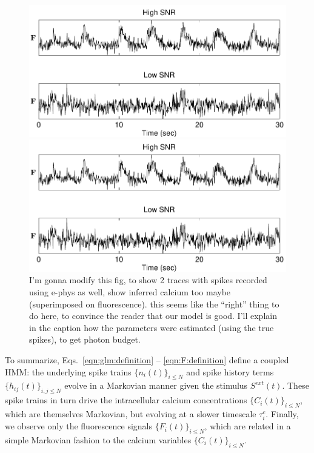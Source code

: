 \begin{figure}
\centering
\begin{minipage}[c]{0.45\hsize}
\includegraphics[width=\hsize]{../figs/example_traces}
\end{minipage}
\centering
\begin{minipage}[c]{0.45\hsize}
\includegraphics[width=\hsize]{../figs/example_traces}
\end{minipage}
\caption{I'm gonna modify this fig, to show 2 traces with spikes recorded using e-phys as well, show inferred calcium too maybe (superimposed on fluorescence).  this seems like the ``right'' thing to do here, to convince the reader that our model is good. I'll explain in the caption how the parameters were estimated (using the true spikes), to get photon budget.}
\label{fig:example_traces}
\end{figure}

To summarize, Eqs.~\eqref{eqn:glm:definition} -- \eqref{eqn:F:definition} define a coupled HMM: the underlying spike trains $\{n_i(t)\}_{i\leq N}$ and spike history terms $\{h_{ij}(t)\}_{i,j\leq N}$ evolve in a Markovian manner given the stimulus $S^{ext}(t)$. These spike trains in turn drive the intracellular calcium concentrations $\{C_i(t)\}_{i\leq N}$, which are themselves Markovian, but evolving at a slower timescale $\tau_i^c$. Finally, we observe only the fluorescence signals $\{F_i(t)\}_{i\leq N}$, which are related in a simple Markovian fashion to the calcium variables $\{C_i(t)\}_{i\leq N}$.


